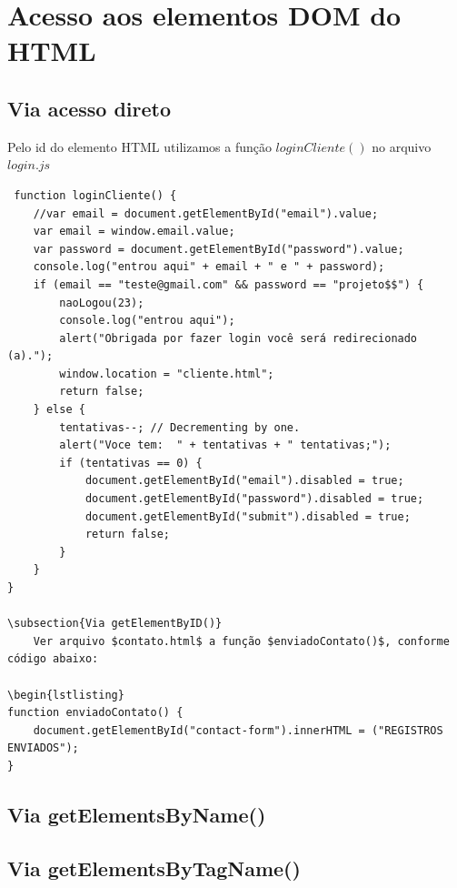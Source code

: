 \section{Acesso aos elementos DOM do HTML }

\subsection{Via acesso direto}

 Pelo id do elemento HTML utilizamos a função $loginCliente()$ no arquivo $login.js$
 \begin{lstlisting}
 function loginCliente() {
    //var email = document.getElementById("email").value;
    var email = window.email.value;
    var password = document.getElementById("password").value;
    console.log("entrou aqui" + email + " e " + password);
    if (email == "teste@gmail.com" && password == "projeto$$") {
        naoLogou(23);
        console.log("entrou aqui");
        alert("Obrigada por fazer login você será redirecionado (a).");
        window.location = "cliente.html";
        return false;
    } else {
        tentativas--; // Decrementing by one.
        alert("Voce tem:  " + tentativas + " tentativas;");
        if (tentativas == 0) {
            document.getElementById("email").disabled = true;
            document.getElementById("password").disabled = true;
            document.getElementById("submit").disabled = true;
            return false;
        }
    }
}
 
\subsection{Via getElementByID()}
	Ver arquivo $contato.html$ a função $enviadoContato()$, conforme código abaixo:
	
\begin{lstlisting}
function enviadoContato() {
    document.getElementById("contact-form").innerHTML = ("REGISTROS ENVIADOS");
}
\end{lstlisting}

\subsection{Via getElementsByName()}



\subsection{Via getElementsByTagName()}



